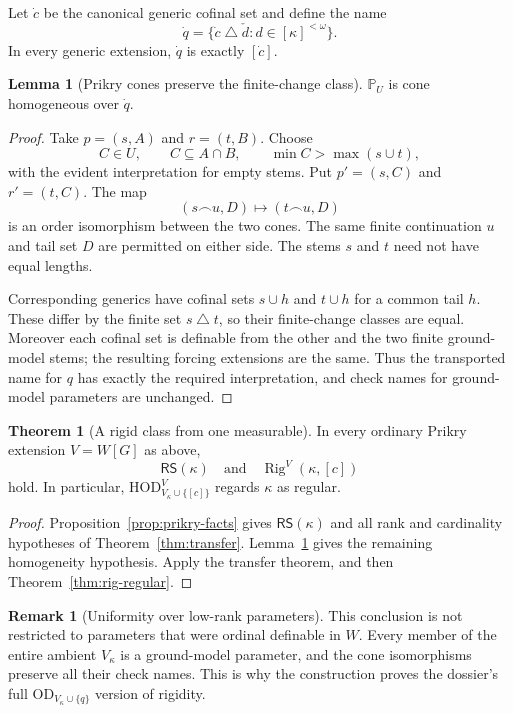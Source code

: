 \documentclass[11pt,letterpaper]{article}
\theoremstyle{definition}
\newtheorem{theorem}[definition]{Theorem}
\newtheorem{lemma}[definition]{Lemma}
\newtheorem{remark}[definition]{Remark}
\numberwithin{equation}{section}
\newcommand{\HOD}{\mathrm{HOD}}
\newcommand{\OD}{\mathrm{OD}}
\newcommand{\PP}{\mathbb P}
\newcommand{\Rig}{\operatorname{Rig}}
\newcommand{\RS}{\mathsf{RS}}
\newcommand{\splus}{\mathbin{\smallfrown}}
\newcommand{\symdiff}{\mathbin{\triangle}}
\begin{document}
Let $\dot c$ be the canonical generic cofinal set and define the name
\[
 \dot q=\{\dot c\symdiff\check d:d\in[\kappa]^{<\omega}\}.
\]
In every generic extension, $\dot q$ is exactly $[\dot c]$.

\begin{lemma}[Prikry cones preserve the finite-change class]\label{lem:prikry-q}
$\PP_U$ is cone homogeneous over $\dot q$.
\end{lemma}
\begin{proof}
Take $p=(s,A)$ and $r=(t,B)$. Choose
\[
 C\in U,\qquad C\subseteq A\cap B,
 \qquad \min C>\max(s\cup t),
\]
with the evident interpretation for empty stems. Put $p'=(s,C)$ and
$r'=(t,C)$. The map
\[
 (s\splus u,D)\longmapsto(t\splus u,D)
\]
is an order isomorphism between the two cones. The same finite continuation
$u$ and tail set $D$ are permitted on either side. The stems $s$ and $t$
need not have equal lengths.

Corresponding generics have cofinal sets $s\cup h$ and $t\cup h$ for a
common tail $h$. These differ by the finite set $s\symdiff t$, so their
finite-change classes are equal. Moreover each cofinal set is definable
from the other and the two finite ground-model stems; the resulting
forcing extensions are the same. Thus the transported name for $q$ has
exactly the required interpretation, and check names for ground-model
parameters are unchanged.
\end{proof}

\begin{theorem}[A rigid class from one measurable]\label{thm:prikry-rig}
In every ordinary Prikry extension $V=W[G]$ as above,
\[
 \RS(\kappa)\quad\text{and}\quad\Rig^V(\kappa,[c])
\]
hold. In particular,
$\HOD^V_{V_\kappa\cup\{[c]\}}$ regards $\kappa$ as regular.
\end{theorem}
\begin{proof}
Proposition~\ref{prop:prikry-facts} gives $\RS(\kappa)$ and all rank and
cardinality hypotheses of Theorem~\ref{thm:transfer}.
Lemma~\ref{lem:prikry-q} gives the remaining homogeneity hypothesis.
Apply the transfer theorem, and then Theorem~\ref{thm:rig-regular}.
\end{proof}

\begin{remark}[Uniformity over low-rank parameters]
This conclusion is not restricted to parameters that were ordinal definable
in $W$. Every member of the entire ambient $V_\kappa$ is a ground-model
parameter, and the cone isomorphisms preserve all their check names.
This is why the construction proves the dossier's full
$\OD_{V_\kappa\cup\{q\}}$ version of rigidity.
\end{remark}
\end{document}
